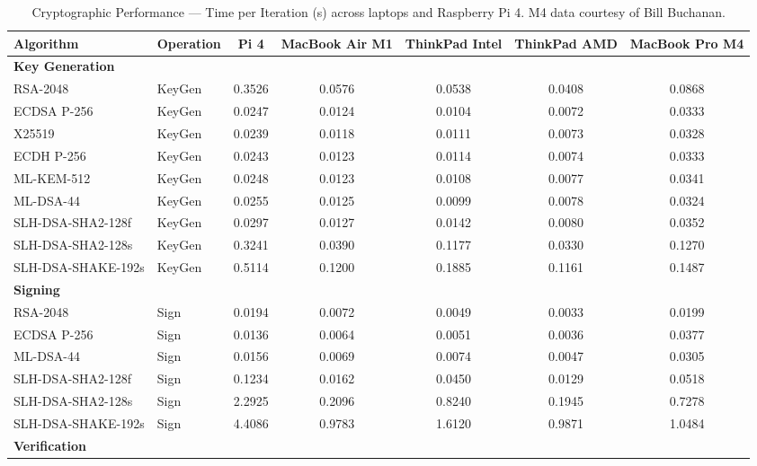 \documentclass[11pt, letterpaper]{article}
\begin{document}
\begin{table}[H]
\centering
\scriptsize
\caption{Cryptographic Performance — Time per Iteration (s) across laptops and Raspberry Pi 4. M4 data courtesy of Bill Buchanan.}
\begin{adjustbox}{max width=\textwidth}
\begin{tabular}{llccccc}
\hline
Algorithm & Operation & Pi 4 & MacBook Air M1 & ThinkPad Intel & ThinkPad AMD & MacBook Pro M4 \\
\hline

\multicolumn{7}{l}{\textbf{Key Generation}} \\

RSA-2048 & KeyGen & 0.3526 & 0.0576 & 0.0538 & 0.0408 & 0.0868 \\
ECDSA P-256 & KeyGen & 0.0247 & 0.0124 & 0.0104 & 0.0072 & 0.0333 \\
X25519 & KeyGen & 0.0239 & 0.0118 & 0.0111 & 0.0073 & 0.0328 \\
ECDH P-256 & KeyGen & 0.0243 & 0.0123 & 0.0114 & 0.0074 & 0.0333 \\
ML-KEM-512 & KeyGen & 0.0248 & 0.0123 & 0.0108 & 0.0077 & 0.0341 \\
ML-DSA-44 & KeyGen & 0.0255 & 0.0125 & 0.0099 & 0.0078 & 0.0324 \\
SLH-DSA-SHA2-128f & KeyGen & 0.0297 & 0.0127 & 0.0142 & 0.0080 & 0.0352 \\
SLH-DSA-SHA2-128s & KeyGen & 0.3241 & 0.0390 & 0.1177 & 0.0330 & 0.1270 \\
SLH-DSA-SHAKE-192s & KeyGen & 0.5114 & 0.1200 & 0.1885 & 0.1161 & 0.1487 \\

\hline
\multicolumn{7}{l}{\textbf{Signing}} \\

RSA-2048 & Sign & 0.0194 & 0.0072 & 0.0049 & 0.0033 & 0.0199 \\
ECDSA P-256 & Sign & 0.0136 & 0.0064 & 0.0051 & 0.0036 & 0.0377 \\
ML-DSA-44 & Sign & 0.0156 & 0.0069 & 0.0074 & 0.0047 & 0.0305 \\
SLH-DSA-SHA2-128f & Sign & 0.1234 & 0.0162 & 0.0450 & 0.0129 & 0.0518 \\
SLH-DSA-SHA2-128s & Sign & 2.2925 & 0.2096 & 0.8240 & 0.1945 & 0.7278 \\
SLH-DSA-SHAKE-192s & Sign & 4.4086 & 0.9783 & 1.6120 & 0.9871 & 1.0484 \\

\hline
\multicolumn{7}{l}{\textbf{Verification}} \\


\end{tabular}
\end{adjustbox}
\end{table}
\end{document}
